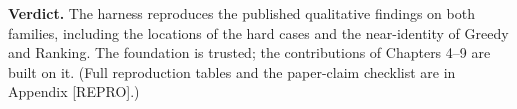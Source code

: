 \textbf{Verdict.} The harness reproduces the published qualitative findings on both families,
including the locations of the hard cases and the near-identity of Greedy and Ranking. The
foundation is trusted; the contributions of Chapters 4--9 are built on it. (Full
reproduction tables and the paper-claim checklist are in Appendix {[}REPRO{]}.)
